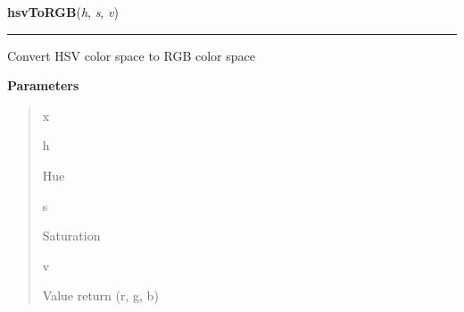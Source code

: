     \label{System:Colors:hsvToRGB}

    \vspace{0.5ex}

\hspace{.8\funcindent}\begin{boxedminipage}{\funcwidth}

    \raggedright \textbf{hsvToRGB}(\textit{h}, \textit{s}, \textit{v})

    \vspace{-1.5ex}

    \rule{\textwidth}{0.5\fboxrule}
\setlength{\parskip}{2ex}
    Convert HSV color space to RGB color space

\setlength{\parskip}{1ex}
      \textbf{Parameters}
      \vspace{-1ex}

      \begin{quote}
        \begin{Ventry}{x}

          \item[h]

          Hue

          \item[s]

          Saturation

          \item[v]

          Value return (r, g, b)

        \end{Ventry}

      \end{quote}

    \end{boxedminipage}

